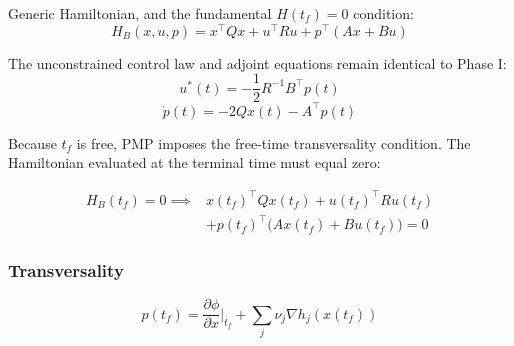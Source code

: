 \documentclass[letterpaper, 10 pt, conference]{ieeeconf}
\begin{document}
Generic Hamiltonian, and the fundamental $H(t_f) = 0$ condition:
\[H_B(x, u, p) = x^\top Q x + u^\top R u + p^\top (Ax + Bu)\]

The unconstrained control law and adjoint equations remain identical to Phase I:
\[u^*(t) = -\frac{1}{2} R^{-1} B^\top p(t)\]
\[\dot{p}(t) = -2Qx(t) - A^\top p(t)\]

Because $t_f$ is free, PMP imposes the free-time transversality condition. The Hamiltonian evaluated at the terminal time must equal zero: 

\[
\begin{aligned}
H_B(t_f) = 0 \implies & x(t_f)^\top Q x(t_f) + u(t_f)^\top R u(t_f) \\
& + p(t_f)^\top \big( Ax(t_f) + Bu(t_f) \big) = 0
\end{aligned}
\]

\subsubsection*{Transversality} 

\[p(t_f) = \frac{\partial \phi}{\partial x}\bigg|_{t_f} + \sum_{j} \nu_j \nabla h_j(x(t_f))\]
\end{document}
